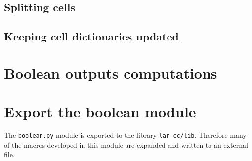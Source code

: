 \documentclass[11pt,oneside]{article}	%
\begin{document}
\subsection{Splitting cells}
\subsection{Keeping cell dictionaries updated}
\section{Boolean outputs computations}
\section{Export the boolean module}

The \texttt{boolean.py} module is exported to the library \texttt{lar-cc/lib}. Therefore many of the macros developed in this module are expanded and written to an external file.
\end{document}
